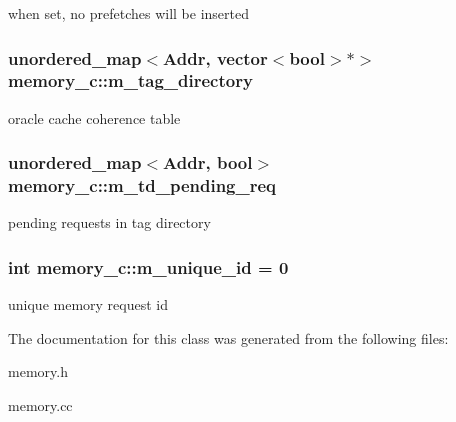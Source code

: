 \label{classmemory__c_ac90f740154b2099375a4464a264c3dc0}
when set, no prefetches will be inserted \hypertarget{classmemory__c_ab6ce4ddeb85e8798bb9d844e6b2d6941}{
\subsubsection[{m\_\-tag\_\-directory}]{\setlength{\rightskip}{0pt plus 5cm}unordered\_\-map$<$Addr, vector$<$bool$>$$\ast$$>$ {\bf memory\_\-c::m\_\-tag\_\-directory}}}
\label{classmemory__c_ab6ce4ddeb85e8798bb9d844e6b2d6941}
oracle cache coherence table \hypertarget{classmemory__c_a4955ca08d109aa65c8532a1488dfffbb}{
\subsubsection[{m\_\-td\_\-pending\_\-req}]{\setlength{\rightskip}{0pt plus 5cm}unordered\_\-map$<$Addr, bool$>$ {\bf memory\_\-c::m\_\-td\_\-pending\_\-req}}}
\label{classmemory__c_a4955ca08d109aa65c8532a1488dfffbb}
pending requests in tag directory \hypertarget{classmemory__c_a69b0fb5c2a19b6a196e86d1842a8a8a8}{
\subsubsection[{m\_\-unique\_\-id}]{\setlength{\rightskip}{0pt plus 5cm}int {\bf memory\_\-c::m\_\-unique\_\-id} = 0}}
\label{classmemory__c_a69b0fb5c2a19b6a196e86d1842a8a8a8}
unique memory request id 

The documentation for this class was generated from the following files:\begin{DoxyCompactItemize}
\item 
memory.h\item 
memory.cc\end{DoxyCompactItemize}
